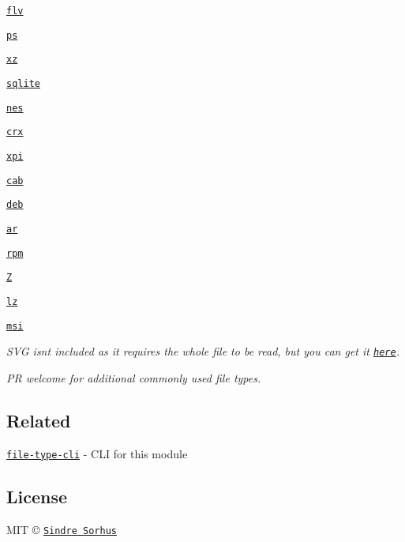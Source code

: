 \begin{DoxyItemize}
\item \href{https://en.wikipedia.org/wiki/Flash_Video}{\tt {\ttfamily flv}}
\item \href{https://en.wikipedia.org/wiki/Postscript}{\tt {\ttfamily ps}}
\item \href{https://en.wikipedia.org/wiki/Xz}{\tt {\ttfamily xz}}
\item \href{https://www.sqlite.org/fileformat2.html}{\tt {\ttfamily sqlite}}
\item \href{http://fileinfo.com/extension/nes}{\tt {\ttfamily nes}}
\item \href{https://developer.chrome.com/extensions/crx}{\tt {\ttfamily crx}}
\item \href{https://en.wikipedia.org/wiki/XPInstall}{\tt {\ttfamily xpi}}
\item \href{https://en.wikipedia.org/wiki/Cabinet_(file_format)}{\tt {\ttfamily cab}}
\item \href{https://en.wikipedia.org/wiki/Deb_(file_format)}{\tt {\ttfamily deb}}
\item \href{https://en.wikipedia.org/wiki/Ar_(Unix)}{\tt {\ttfamily ar}}
\item \href{http://fileinfo.com/extension/rpm}{\tt {\ttfamily rpm}}
\item \href{http://fileinfo.com/extension/z}{\tt {\ttfamily Z}}
\item \href{https://en.wikipedia.org/wiki/Lzip}{\tt {\ttfamily lz}}
\item \href{https://en.wikipedia.org/wiki/Windows_Installer}{\tt {\ttfamily msi}}
\end{DoxyItemize}

{\itshape S\+VG isn\textquotesingle{}t included as it requires the whole file to be read, but you can get it \href{https://github.com/sindresorhus/is-svg}{\tt here}.}

{\itshape PR welcome for additional commonly used file types.}

\subsection*{Related}


\begin{DoxyItemize}
\item \href{https://github.com/sindresorhus/file-type-cli}{\tt file-\/type-\/cli} -\/ C\+LI for this module
\end{DoxyItemize}

\subsection*{License}

M\+IT © \href{https://sindresorhus.com}{\tt Sindre Sorhus} 